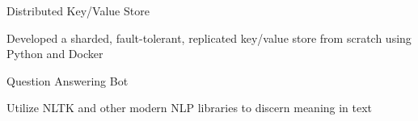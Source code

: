 

\begin{cventries}

  \cventry
    {} %
    {Distributed Key/Value Store} %
    {} %
    {} %
    {
      \begin{cvitems} %
        \item {Developed a sharded, fault-tolerant, replicated key/value store from scratch using Python and Docker}
      \end{cvitems}
    }

  \cventry
    {} %
    {Question Answering Bot} %
    {} %
    {} %
    {
      \begin{cvitems} %
        \item {Utilize NLTK and other modern NLP libraries to discern meaning
          in text}
      \end{cvitems}
    }




\end{cventries}
